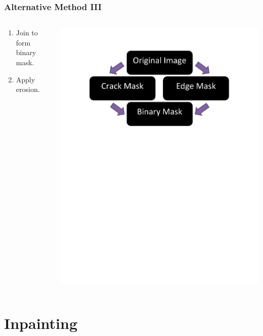 \documentclass{beamer}
\begin{document}
\begin{frame}
\frametitle{Alternative Method III}
\begin{columns}
\begin{column}{0.5\textwidth}
\begin{enumerate}
\item[5] Join to form binary mask.
\item[6] Apply erosion.
\end{enumerate}
\end{column}
\begin{column}{0.5\textwidth}
\includegraphics[width=1\textwidth,trim={1in 6.5in 1in 0in},clip]{alternative_method_diagram_3}
\end{column}
\end{columns}
\end{frame}

\section[Inpainting]{Inpainting}
\end{document}
